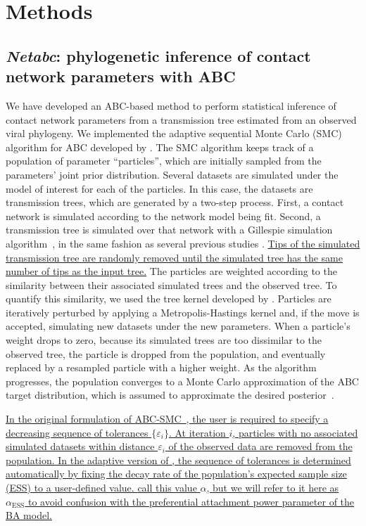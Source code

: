 \documentclass[12pt]{article}\usepackage[]{graphicx}\usepackage[]{color}
\let\mciteauthor\citeauthor
\renewcommand{\citeauthor}[1]{\mbox{\mciteauthor{#1}}}
\newcommand{\add}[1]{\color{blue} \uline{#1} \color{black}}
\begin{document}
\section*{Methods}

\subsection*{\textit{Netabc}: phylogenetic inference of contact network
parameters with ABC}

We have developed an ABC-based method to perform statistical inference of
contact network parameters from a transmission tree estimated from an observed
viral phylogeny. We implemented the adaptive sequential Monte Carlo (SMC)
algorithm for ABC developed by \textcite{del2012adaptive}. The SMC algorithm
keeps track of a population of parameter ``particles'', which are initially
sampled from the parameters' joint prior distribution. Several datasets are
simulated under the model of interest for each of the particles. In this case,
the datasets are transmission trees, which are generated by a two-step process.
First, a contact network is simulated according to the network model being fit.
Second, a transmission tree is simulated over that network with a Gillespie
simulation algorithm~\autocite{gillespie1976general}, in the same fashion as
several previous studies \autocite[\textit{e.g.}][]{robinson2013dynamics,
leventhal2012inferring}. \add{Tips of the simulated transmission tree are
randomly removed until the simulated tree has the same number of tips as the
input tree.} The particles are weighted according to the similarity between
their associated simulated trees and the observed tree. To quantify this
similarity, we used the tree kernel developed by \textcite{poon2013mapping}.
Particles are iteratively perturbed by applying a Metropolis-Hastings kernel
and, if the move is accepted, simulating new datasets under the new parameters.
When a particle's weight drops to zero,
because its simulated trees are too dissimilar to the observed tree, the
particle is dropped from the population, and eventually replaced by a resampled
particle with a higher weight. As the algorithm progresses, the population
converges to a Monte Carlo approximation of the ABC target distribution, which
is assumed to approximate the desired posterior~\autocite{del2012adaptive,
sunnaaker2013approximate}. 

\add{In the original formulation of ABC-SMC~\autocite{sisson2007sequential,
beaumont2009adaptive}, the user is required to specify a decreasing sequence of
tolerances $\lbrace\varepsilon_i\rbrace$. At iteration $i$, particles with no
associated simulated datasets within distance $\varepsilon_i$ of the observed
data are removed from the population. In the adaptive version of
\textcite{del2012adaptive}, the sequence of tolerances is determined
automatically by fixing the decay rate of the population's expected sample size
(ESS) to a user-defined value. \citeauthor{del2012adaptive} call this value
$\alpha$, but we will refer to it here as $\alpha_{\text{ESS}}$ to avoid
confusion with the preferential attachment power parameter of the BA model.} 
\end{document}
